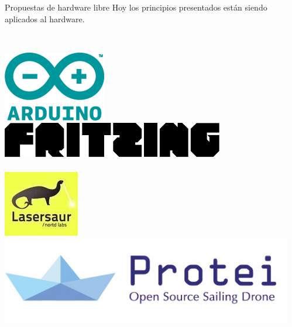   \begin{frame}{Propuestas de hardware libre}
    Hoy los principios presentados están siendo aplicados al hardware.\\~\\
    \begin{columns}
        \vspace{.5cm}
        \begin{center}
              \includegraphics[width=.35\textwidth]{vendor/images/arduino_logo.png} \hspace{.1\textwidth}
              \includegraphics[width=.5\textwidth]{vendor/images/fritzing_logo.pdf}\\~\\
              \includegraphics[width=.25\textwidth]{vendor/images/lasersaur.jpg} \hspace{.1\textwidth}
          \includegraphics[width=.6\textwidth]{vendor/images/protei.png}\\~\\
        \end{center}
        \begin{center}

\end{center}
\end{columns}
\end{frame}
